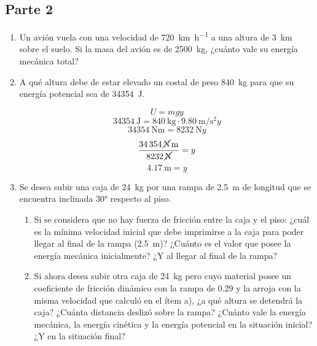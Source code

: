 \documentclass[Física - Práctica.root.tex]{subfiles}
\begin{document}
\subsection{Parte 2}
\begin{enumerate}
  \item Un avión vuela con una velocidad de \SI{720}{\km\per\hour} a una altura de \SI{3}{\km} sobre el suelo. Si la
        masa del avión es de \SI{2500}{\kilo\gram}, ¿cuánto vale su energía mecánica total?

  \item A qué altura debe de estar elevado un costal de peso \SI{840}{\kilo\gram} para que su energía
        potencial sea de \SI{34354}{\joule}.
        \begin{center}
          \[ U = mgy \]
          \[ \SI{34354}{\joule} = \SI{840}{\kilo\gram}\cdot\SI{9,80}{\m\per\s\squared}y \]
          \[ \SI{34354}{\newton\meter} = \SI{8232}{\newton}y \]
          \[ \frac{\SI{34354}{\cancel\newton\meter}}{\SI{8232}{\cancel\newton}} = y \]
          \[ \boxed{\SI{4,17}{\meter} = y} \]
        \end{center}

  \item Se desea subir una caja de \SI{24}{\kilo\gram} por una rampa de \SI{2,5}{\meter} de longitud que se encuentra
        inclinada \ang{30} respecto al piso.
        \begin{enumerate}
          \item Si se considera que no hay fuerza de fricción entre la caja y el piso: ¿cuál es la mínima
                velocidad inicial que debe imprimirse a la caja para poder llegar al final de la rampa (\SI{2,5}{\meter})?
                ¿Cuánto es el valor que posee la energía mecánica inicialmente? ¿Y al llegar al final
                de la rampa?
          \item Si ahora desea subir otra caja de \SI{24}{\kilo\gram} pero cuyo material posee un coeficiente de
                fricción dinámico con la rampa de \num{0,29} y la arroja con la misma velocidad que calculó en
                el ítem a), ¿a qué altura se detendrá la caja? ¿Cuánta distancia deslizó sobre la rampa?
                ¿Cuánto vale la energía mecánica, la energía cinética y la energía potencial en la situación
                inicial? ¿Y en la situación final?
        \end{enumerate}


\end{enumerate}
\end{document}
